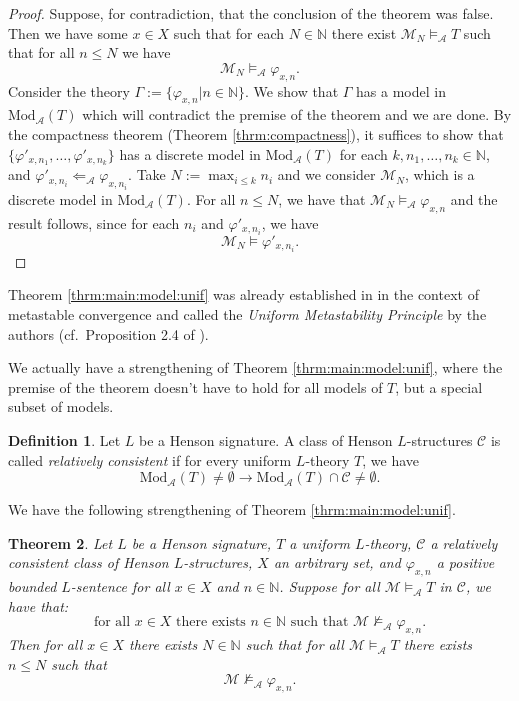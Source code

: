 \documentclass[11pt]{amsart}
\newtheorem{theorem}{Theorem}[section]
\theoremstyle{definition}
\newtheorem{definition}[theorem]{Definition}
\theoremstyle{remark}
\def\NN{\mathbb{N}}
\begin{document}
\begin{proof}
       Suppose, for contradiction, that the conclusion of the theorem was false. Then we have some $x \in X$ such that for each $N \in \NN$ there exist $\mathcal{M}_N\models_{\mathcal{A}}T$ such that for all $n \le N$ we have 
    \[
 \mathcal{M}_N \models_{\mathcal{A}} \varphi_{x,n}.
    \]
Consider the theory $\Gamma:=\{\varphi_{x,n}| n \in \NN\}$. We show that $\Gamma$ has a model in $\mathrm{Mod}_{\mathcal{A}}(T)$ which will contradict the premise of the theorem and we are done. By the compactness theorem (Theorem \ref{thrm:compactness}), it suffices to show that $\{\varphi'_{x,n_1},\ldots,\varphi'_{x,n_k}\}$ has a discrete model in $\mathrm{Mod}_{\mathcal{A}}(T)$ for each $k,n_1,\ldots,n_k \in \NN$, and $\varphi'_{x,n_i}\Leftarrow_{\mathcal{A}}\varphi_{x,n_i}$. Take $N:= \max_{i\le k} n_i$ and we consider $\mathcal{M}_N$, which is a discrete model in $\mathrm{Mod}_{\mathcal{A}}(T)$. For all $n\le N$, we have that $\mathcal{M}_N\models_{\mathcal{A}}\varphi_{x,n}$ and the result follows, since for each $n_i$ and $\varphi'_{x,n_i}$, we have 
       \[
 \mathcal{M}_N \models \varphi'_{x,n_i}.
    \]
\end{proof}
Theorem \ref{thrm:main:model:unif} was already established in \cite{DI2017} in the context of metastable convergence and called the \emph{Uniform Metastability Principle} by the authors (cf.\ Proposition 2.4 of \cite{DI2017}).

We actually have a strengthening of Theorem \ref{thrm:main:model:unif}, where the premise of the theorem doesn't have to hold for all models of $T$, but a special subset of models.

\begin{definition}
      Let $L$ be a Henson signature. A class of Henson $L$-structures $\mathscr{C}$ is called \emph{relatively consistent} if for every uniform $L$-theory $T$, we have
      \[
      \mathrm{Mod}_{\mathcal{A}}(T)\neq \emptyset \to  \mathrm{Mod}_{\mathcal{A}}(T)\cap \mathscr{C} \neq \emptyset.
      \]
\end{definition}
We have the following strengthening of Theorem \ref{thrm:main:model:unif}.
\begin{theorem}
\label{thrm:main:model:unif:gen}
  Let $L$ be a Henson signature, $T$ a uniform $L$-theory, $\mathscr{C}$ a relatively consistent class of Henson $L$-structures, $X$ an arbitrary set, and $\varphi_{x,n}$ a positive bounded $L$-sentence for all $x \in X$ and $n \in \NN$. Suppose for all $\mathcal{M} \models_{\mathcal{A}} T$ in $\mathscr{C}$, we have that: 
  \[
  \mbox{for all } x \in X \mbox{ there exists } n \in \NN \mbox{ such that }
    \mathcal{M}\nvDash_{\mathcal{A}} \varphi_{x,n}.
  \]
Then for all $x \in X$ there exists $N \in \NN$ such that for all $\mathcal{M}\models_{\mathcal{A}} T$ there exists $n \le N$ such that  
\[
\mathcal{M} \nvDash_{\mathcal{A}} \varphi_{x,n}.
\]
\end{theorem}
\end{document}
